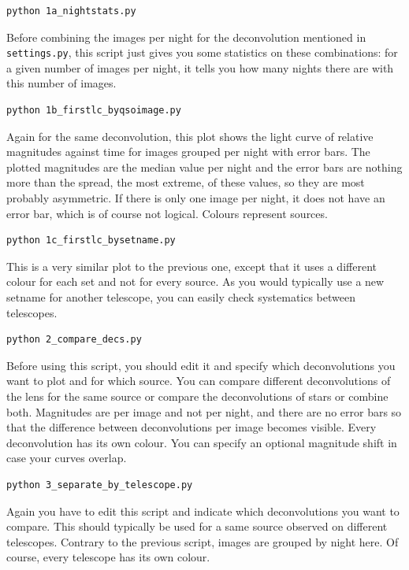 \begin{Verbatim}
python 1a_nightstats.py
\end{Verbatim}

Before combining the images per night for the deconvolution mentioned in \verb+settings.py+, this script just gives you some statistics on these combinations: for a given number of images per night, it tells you how many nights there are with this number of images.

\begin{Verbatim}
python 1b_firstlc_byqsoimage.py
\end{Verbatim}

Again for the same deconvolution, this plot shows the light curve of relative magnitudes against time for images grouped per night with error bars. The plotted magnitudes are the median value per night and the error bars are nothing more than the spread, the most extreme, of these values, so they are most probably asymmetric. If there is only one image per night, it does not have an error bar, which is of course not logical. Colours represent sources.

\begin{Verbatim}
python 1c_firstlc_bysetname.py
\end{Verbatim}

This is a very similar plot to the previous one, except that it uses a different colour for each set and not for every source. As you would typically use a new setname for another telescope, you can easily check systematics between telescopes.

\begin{Verbatim}
python 2_compare_decs.py
\end{Verbatim}

Before using this script, you should edit it and specify which deconvolutions you want to plot and for which source. You can compare different deconvolutions of the lens for the same source or compare the deconvolutions of stars or combine both. Magnitudes are per image and not per night, and there are no error bars so that the difference between deconvolutions per image becomes visible. Every deconvolution has its own colour. You can specify an optional magnitude shift in case your curves overlap.

\begin{Verbatim}
python 3_separate_by_telescope.py
\end{Verbatim}

Again you have to edit this script and indicate which deconvolutions you want to compare. This should typically be used for a same source observed on different telescopes. Contrary to the previous script, images are grouped by night here. Of course, every telescope has its own colour.

